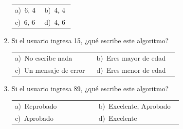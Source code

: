 \documentclass[11pt,a4paper]{article}
\begin{document}
\begin{enumerate}[label=\textbf{\arabic*.},leftmargin=*,itemsep=11pt,topsep=0pt]
\begin{minipage}[t]{\linewidth}
\vspace{2pt}{\small
\begin{verbatim}
INICIO
   ENTERO a, b, aux
   a ← 4
   b ← 6
   aux ← a
   a ← b
   b ← aux
   ESCRIBIR a, b
FIN
\end{verbatim}}


\vspace{4pt}
\begin{tabular}{@{}p{0.47\linewidth}p{0.47\linewidth}@{}}
a)~6, 4 & b)~4, 4 \\
c)~6, 6 & d)~4, 6 \\
\end{tabular}
\end{minipage}

\item \begin{minipage}[t]{\linewidth}
Si el usuario ingresa 15, ¿qué escribe este algoritmo?

\vspace{2pt}{\small
\begin{verbatim}
LEER edad
SI edad >= 18 ENTONCES
   ESCRIBIR "Eres mayor de edad"
FIN_SI
\end{verbatim}}


\vspace{4pt}
\begin{tabular}{@{}p{0.47\linewidth}p{0.47\linewidth}@{}}
a)~No escribe nada & b)~Eres mayor de edad \\
c)~Un mensaje de error & d)~Eres menor de edad \\
\end{tabular}
\end{minipage}

\item \begin{minipage}[t]{\linewidth}
Si el usuario ingresa 89, ¿qué escribe este algoritmo?

\vspace{2pt}{\small
\begin{verbatim}
LEER nota
SI nota >= 90 ENTONCES
   ESCRIBIR "Excelente"
SINO
   SI nota >= 70 ENTONCES
      ESCRIBIR "Aprobado"
   SINO
      ESCRIBIR "Reprobado"
   FIN_SI
FIN_SI
\end{verbatim}}


\vspace{4pt}
\begin{tabular}{@{}p{0.47\linewidth}p{0.47\linewidth}@{}}
a)~Reprobado & b)~Excelente, Aprobado \\
c)~Aprobado & d)~Excelente \\
\end{tabular}
\end{minipage}


\end{enumerate}
\end{document}
